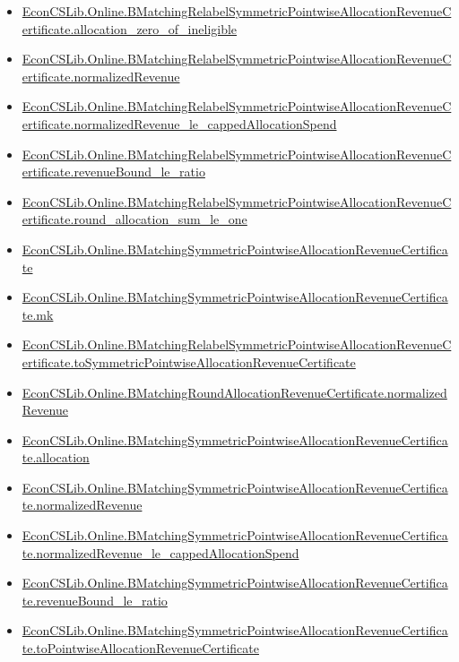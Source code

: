 \documentclass[10pt]{article}
\begin{document}
\begin{itemize}[leftmargin=1.2em]
\begin{itemize}[leftmargin=1.2em]
\item \hyperlink{library-prerequisite-49dad38b6ad30ba7}{EconCSLib.Online.BMatchingRelabelSymmetricPointwiseAllocationRevenueCertificate.allocation\_zero\_of\_ineligible}
\item \hyperlink{library-prerequisite-8ba9c0b5da3df7b9}{EconCSLib.Online.BMatchingRelabelSymmetricPointwiseAllocationRevenueCertificate.normalizedRevenue}
\item \hyperlink{library-prerequisite-fa7bda6eed2aca13}{EconCSLib.Online.BMatchingRelabelSymmetricPointwiseAllocationRevenueCertificate.normalizedRevenue\_le\_cappedAllocationSpend}
\item \hyperlink{library-prerequisite-cdf5bfa4fc4e7ed4}{EconCSLib.Online.BMatchingRelabelSymmetricPointwiseAllocationRevenueCertificate.revenueBound\_le\_ratio}
\item \hyperlink{library-prerequisite-e52cc4921e852931}{EconCSLib.Online.BMatchingRelabelSymmetricPointwiseAllocationRevenueCertificate.round\_allocation\_sum\_le\_one}
\item \hyperlink{library-prerequisite-97f367df98719394}{EconCSLib.Online.BMatchingSymmetricPointwiseAllocationRevenueCertificate}
\item \hyperlink{library-prerequisite-59efad41fbf1a494}{EconCSLib.Online.BMatchingSymmetricPointwiseAllocationRevenueCertificate.mk}
\item \hyperlink{library-prerequisite-556bebda47130c54}{EconCSLib.Online.BMatchingRelabelSymmetricPointwiseAllocationRevenueCertificate.toSymmetricPointwiseAllocationRevenueCertificate}
\item \hyperlink{library-prerequisite-cd14fb41efd2fc36}{EconCSLib.Online.BMatchingRoundAllocationRevenueCertificate.normalizedRevenue}
\item \hyperlink{library-prerequisite-318697c8d541dff4}{EconCSLib.Online.BMatchingSymmetricPointwiseAllocationRevenueCertificate.allocation}
\item \hyperlink{library-prerequisite-28657b34143010b7}{EconCSLib.Online.BMatchingSymmetricPointwiseAllocationRevenueCertificate.normalizedRevenue}
\item \hyperlink{library-prerequisite-2b12e2d11c6748e1}{EconCSLib.Online.BMatchingSymmetricPointwiseAllocationRevenueCertificate.normalizedRevenue\_le\_cappedAllocationSpend}
\item \hyperlink{library-prerequisite-dfe0de445969206c}{EconCSLib.Online.BMatchingSymmetricPointwiseAllocationRevenueCertificate.revenueBound\_le\_ratio}
\item \hyperlink{library-prerequisite-53a4c980391a995c}{EconCSLib.Online.BMatchingSymmetricPointwiseAllocationRevenueCertificate.toPointwiseAllocationRevenueCertificate}

\end{itemize}
\end{itemize}
\end{document}
